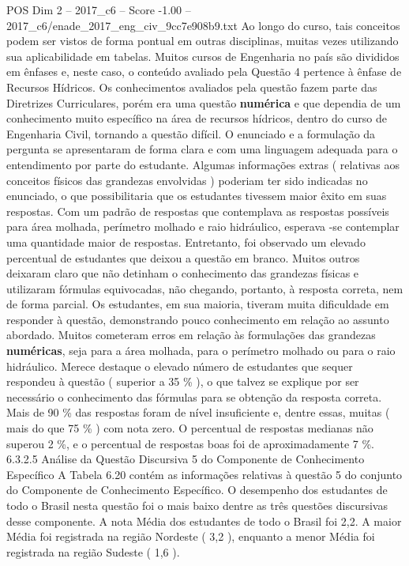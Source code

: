 \begin{textsample}{POS Dim 2 – 2017\_c6 – Score -1.00 – 2017\_c6/enade\_2017\_eng\_civ\_9cc7e908b9.txt}
Ao longo do curso, tais conceitos podem ser vistos de forma pontual em outras disciplinas, muitas vezes utilizando sua aplicabilidade em tabelas.
Muitos cursos de Engenharia no país são divididos em ênfases e, neste caso, o conteúdo avaliado pela Questão 4 pertence à ênfase de Recursos Hídricos.
Os conhecimentos avaliados pela questão fazem parte das Diretrizes Curriculares, porém era uma questão \textbf{numérica} e que dependia de um conhecimento muito específico na área de recursos hídricos, dentro do curso de Engenharia Civil, tornando a questão difícil.
O enunciado e a formulação da pergunta se apresentaram de forma clara e com uma linguagem adequada para o entendimento por parte do estudante.
Algumas informações extras ( relativas aos conceitos físicos das grandezas envolvidas ) poderiam ter sido indicadas no enunciado, o que possibilitaria que os estudantes tivessem maior êxito em suas respostas.
Com um padrão de respostas que contemplava as respostas possíveis para área molhada, perímetro molhado e raio hidráulico, esperava -se contemplar uma quantidade maior de respostas.
Entretanto, foi observado um elevado percentual de estudantes que deixou a questão em branco.
Muitos outros deixaram claro que não detinham o conhecimento das grandezas físicas e utilizaram fórmulas equivocadas, não chegando, portanto, à resposta correta, nem de forma parcial.
Os estudantes, em sua maioria, tiveram muita dificuldade em responder à questão, demonstrando pouco conhecimento em relação ao assunto abordado.
Muitos cometeram erros em relação às formulações das grandezas \textbf{numéricas}, seja para a área molhada, para o perímetro molhado ou para o raio hidráulico.
Merece destaque o elevado número de estudantes que sequer respondeu à questão ( superior a 35 \% ), o que talvez se explique por ser necessário o conhecimento das fórmulas para se obtenção da resposta correta.
Mais de 90 \% das respostas foram de nível insuficiente e, dentre essas, muitas ( mais do que 75 \% ) com nota zero.
O percentual de respostas medianas não superou 2 \%, e o percentual de respostas boas foi de aproximadamente 7 \%. 6.3.2.5 Análise da Questão Discursiva 5 do Componente de Conhecimento Específico A Tabela 6.20 contém as informações relativas à questão 5 do conjunto do Componente de Conhecimento Específico.
O desempenho dos estudantes de todo o Brasil nesta questão foi o mais baixo dentre as três questões discursivas desse componente.
A nota Média dos estudantes de todo o Brasil foi 2,2.
A maior Média foi registrada na região Nordeste ( 3,2 ), enquanto a menor Média foi registrada na região Sudeste ( 1,6 ).

\end{textsample}

